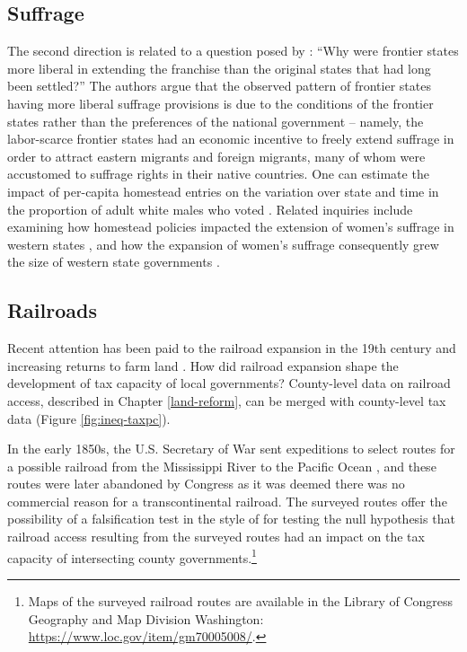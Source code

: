 \subsection{Suffrage} The second direction is related to a question posed by \citet{engerman2005evolution}: ``Why were frontier states more liberal in extending the franchise than the original states that had long been settled?'' The authors argue that the observed pattern of frontier states having more liberal suffrage provisions is due to the conditions of the frontier states rather than the preferences of the national government -- namely, the labor-scarce frontier states had an economic incentive to freely extend suffrage in order to attract eastern migrants and foreign migrants, many of whom were accustomed to suffrage rights in their native countries. One can estimate the impact of per-capita homestead entries on the variation over state and time in the proportion of adult white males who voted \citep{mccormick1960new}. Related inquiries include examining how homestead policies impacted the extension of women's suffrage in western states \citep{teele2018west}, and how the expansion of women's suffrage consequently grew the size of western state governments \citep{lott1999did}.

\subsection{Railroads} Recent attention has been paid to the railroad expansion in the 19th century and increasing returns to farm land  \citep{donaldson2016railroads}. How did railroad expansion shape the development of tax capacity of local governments? County-level data on railroad access, described in Chapter \ref{land-reform}, can be merged with county-level tax data (Figure \ref{fig:ineq-taxpc}). 

In the early 1850s, the U.S. Secretary of War sent expeditions to select routes for a possible railroad from the Mississippi River to the Pacific Ocean \citep{blake1857geological,baird1858reports}, and these routes were later abandoned by Congress as it was deemed there was no commercial reason for a transcontinental railroad. The surveyed routes offer the possibility of a falsification test in the style of \citep{donaldson2018railroads} for testing the null hypothesis that railroad access resulting from the surveyed routes had an impact on the tax capacity of intersecting county governments.\footnote{Maps of the surveyed railroad routes are available in the Library of Congress Geography and Map Division Washington: \url{https://www.loc.gov/item/gm70005008/}.}

